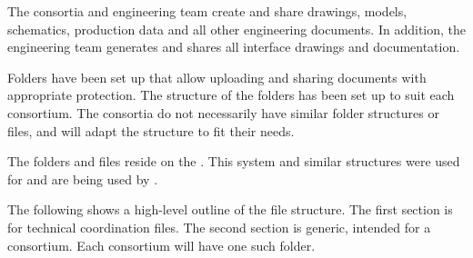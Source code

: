 The consortia and  engineering team create and share
drawings, models, schematics, production data and all other
engineering documents. In addition, the  engineering team
generates and shares all interface drawings and documentation.


Folders have been set up that allow uploading and sharing documents
with appropriate protection. The structure of the folders has been set
up to suit each consortium. The consortia do not necessarily have
similar folder structures or files, and will adapt the structure to fit
their needs.


The folders and files reside on the . This system and
similar structures were used for  and are being
used by .


The following shows a high-level outline of the file structure. The
first section is for technical coordination files. The second
section is generic, intended for a consortium. Each consortium will have one such
folder.
